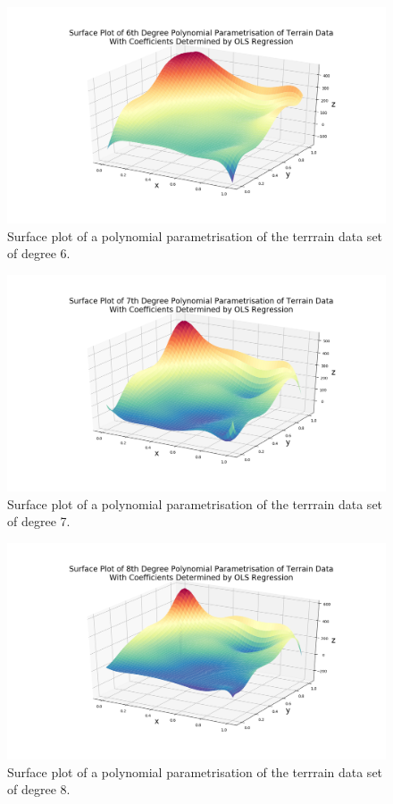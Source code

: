 \documentclass[reprint,english]{revtex4-1}
\begin{document}
\begin{figure}[h]
\centering
\includegraphics[scale=0.25,clip,trim={4cm 2cm 4cm 1cm}]{results/TerrainApprox2/surface_deg6_OLS.png}
\caption{Surface plot of a polynomial parametrisation of the terrrain data set of degree 6.}\label{fig:terrrain_data_contour6}
\end{figure}

\begin{figure}[h]
\centering
\includegraphics[scale=0.25,clip,trim={4cm 2cm 4cm 1cm}]{results/TerrainApprox3/surface_deg7_OLS.png}
\caption{Surface plot of a polynomial parametrisation of the terrrain data set of degree 7.}\label{fig:terrrain_data_contour7}
\end{figure}

\begin{figure}[h]
\centering
\includegraphics[scale=0.25,clip,trim={4cm 2cm 4cm 1cm}]{results/TerrainApprox4/surface_deg8_OLS.png}
\caption{Surface plot of a polynomial parametrisation of the terrrain data set of degree 8.}\label{fig:terrrain_data_contour8}
\end{figure}
\end{document}
